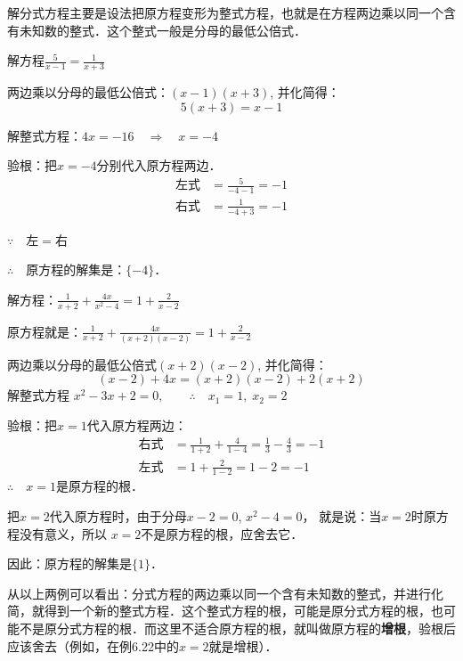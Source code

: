 解分式方程主要是设法把原方程变形为整式方程，也就是在方程两边乘以同一个含有未知数的整式．这个整式一般是分母的最低公倍式．



\begin{example}
 解方程$\frac{5}{x-1}=\frac{1}{x+3}$  
\end{example}

\begin{solution}
两边乘以分母的最低公倍式：$(x-1)(x+3)$, 并化简得：
\[5(x+3)=x-1\]

解整式方程：$4x=-16\quad \Rightarrow\quad x=-4$

验根：把$x=-4$分别代入原方程两边．
\[\begin{split}
    \text{左式}&=\frac{5}{-4-1}=-1\\
    \text{右式}&=\frac{1}{-4+3}=-1  
\end{split}\]

$\because\quad \text{左}=\text{右}$

$\therefore\quad $原方程的解集是：$\{-4\}$．
\end{solution}


\begin{example}
解方程：$\frac{1}{x+2}+\frac{4x}{x^2-4}=1+\frac{2}{x-2}$
\end{example}

\begin{solution}
    原方程就是：$\frac{1}{x+2}+\frac{4x}{(x+2)(x-2)}=1+\frac{2}{x-2}$

    两边乘以分母的最低公倍式$(x+2)(x-2)$, 并化简得：
    \[(x-2)+4x=(x+2)(x-2)+2(x+2)\]
    解整式方程 $x^2-3x+2=0,\qquad \therefore\quad x_1=1,\;x_2=2$
    
    验根：把$x=1$代入原方程两边：
    \[\begin{split}
        \text{右式}&=\frac{1}{1+2}+\frac{4}{1-4}=\frac{1}{3}-\frac{4}{3}=-1\\
        \text{左式}&=1+\frac{2}{1-2}=1-2=-1
    \end{split}\]
    $\therefore\quad x=1$是原方程的根．

    把$x=2$代入原方程时，由于分母$x-2=0$, $x^2-4=0$，
    就是说：当$x=2$时原方程没有意义，所以 $x=2$不是原方程的根，应舍去它．

因此：原方程的解集是$\{1\}$．
\end{solution}

从以上两例可以看出：分式方程的两边乘以同一个含有未知数的整式，并进行化简，就得到一个新的整式方程．这个整式方程的根，可能是原分式方程的根，也可能不是原分式方程的根．而这里不适合原方程的根，就叫做原方程的\textbf{增根}，验根后应该舍去（例如，在例6.22中的$x=2$就是增根）．


